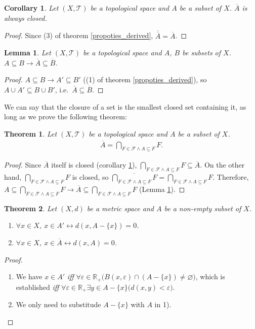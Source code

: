 \documentclass{article}%
\theoremstyle{plain}
\newtheorem{theorem}{Theorem}[section] %
\newtheorem{corollary}{Corollary} %
\newtheorem{lemma}{Lemma} %
\theoremstyle{definition}
\begin{document}
\begin{corollary}\label{closure_closed}
Let $(X,\mathscr T)$ be a topological space and $A$ be a subset of $X$. 
$\overline A$ is always closed.
\end{corollary}
\begin{proof}
Since (3) of theorem \ref{propoties_derived}, $\overline{\overline A} = \overline A$.
\end{proof}

\begin{lemma}\label{subset_closure}
Let $(X,\mathscr T)$ be a topological space and $A$, $B$ be subsets of $X$.
$A\subseteq B \to \overline A\subseteq \overline B$.
\end{lemma}
\begin{proof}
$A\subseteq B \to A'\subseteq B'$ ((1) of theorem \ref{propoties_derived}), so $A\cup A'\subseteq B\cup B'$, i.e.\ $\overline A\subseteq \overline B$.
\end{proof}

We can say that the closure of a set is the smallest closed set containing it, as long as we prove the following theorem:

\begin{theorem}
Let $(X,\mathscr T)$ be a topological space and $A$ be a subset of $X$.
\begin{align*}
	\overline A = \bigcap_{F\in \mathscr F \wedge A\subseteq F} F.
\end{align*}
\end{theorem}
\begin{proof}
Since $\overline A$ itself is closed (corollary \ref{closure_closed}), $\bigcap_{F\in \mathscr F \wedge A\subseteq F} F \subseteq \overline A$. 
On the other hand, $\bigcap_{F\in \mathscr F \wedge A\subseteq F} F$ is closed, so $\overline{\bigcap_{F\in \mathscr F \wedge A\subseteq F} F} = \bigcap_{F\in \mathscr F \wedge A\subseteq F} F$.
Therefore, $A\subseteq \bigcap_{F\in \mathscr F \wedge A\subseteq F} F \to \overline A \subseteq \bigcap_{F\in \mathscr F \wedge A\subseteq F} F$ (Lemma \ref{subset_closure}). 
\end{proof}

\begin{theorem}
Let $(X,d)$ be a metric space and $A$ be a non-empty subset of $X$.
\begin{enumerate}[1)]
\item $\forall x\in X$, $x\in A' \leftrightarrow d(x,A-\{x\}) = 0$.
\item $\forall x\in X$, $x\in \overline A \leftrightarrow d(x,A)=0$.
\end{enumerate}
\end{theorem}
\begin{proof}
\begin{enumerate}[1)]
\item We have $x\in A' $ \emph{iff} $\forall \varepsilon\in \mathbb R_+\big(
	B (x,\varepsilon) \cap (A-\{x\}) \neq \varnothing\big)$, 
which is established \emph{iff} $\forall \varepsilon \in \mathbb R_+\exists y\in A-\{x\}\big(
	d(x,y) <\varepsilon\big)$.
\item We only need to substitude $A-\{x\}$ with $A$ in 1).
\end{enumerate}
\end{proof}
\end{document}
